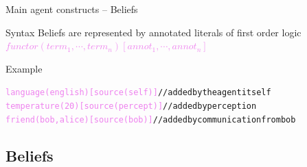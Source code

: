 \documentclass[compress]{beamer}
\newcommand{\comment}[1]{\textcolor{harvestgold}{#1}}
\newcommand{\belief}[1]{\textcolor{violet}{#1}}
\begin{document}
\begin{frame}{Main agent constructs -- Beliefs}
 
 \begin{block}{Syntax}
  Beliefs are represented by annotated literals of first order logic \\
  \belief{$functor(term_1,\cdots,term_n)[annot_1,\cdots,annot_n]$}
 \end{block}
 
 \begin{block}{Example} \footnotesize
  \begin{alltt}
     \belief{language(english)[source(self)]} \comment{//added by the agent itself}\\
     \belief{temperature(20)[source(percept)]} \comment{//added by perception}\\
     \belief{friend(bob,alice)[source(bob)]} \comment{//added by communication from bob}
  \end{alltt}

     
 \end{block}

 
\end{frame}

\subsection{Beliefs}
\end{document}
